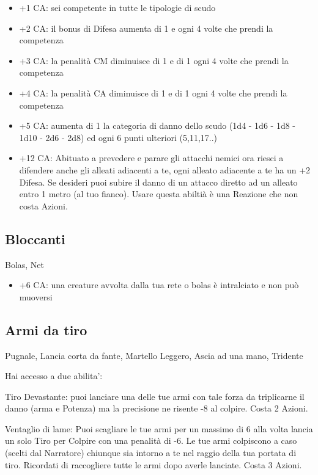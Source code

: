 \documentclass[a4paper,11pt,twoside,openany]{book}
\begin{document}
\begin{itemize}
	\item +1 CA: sei competente in tutte le tipologie di scudo

	\item +2 CA: il bonus di Difesa aumenta di 1 e ogni 4 volte che prendi la competenza

	\item +3 CA: la penalità CM diminuisce di 1 e di 1 ogni 4 volte che prendi la competenza

	\item +4 CA: la penalità CA diminuisce di 1 e di 1 ogni 4 volte che prendi la competenza

	\item +5 CA: aumenta di 1 la categoria di danno dello scudo (1d4 - 1d6 - 1d8 - 1d10 - 2d6 - 2d8) ed ogni 6 punti ulteriori (5,11,17..)

	\item +12 CA: Abituato a prevedere e parare gli attacchi nemici ora riesci a difendere anche gli alleati adiacenti a te, ogni alleato adiacente a te ha un +2 Difesa. Se desideri puoi subire il danno di un attacco diretto ad un alleato entro 1 metro (al tuo fianco). Usare questa abiltià è una Reazione che non costa Azioni.

\end{itemize}

\subsection{Bloccanti} Bolas, Net

\begin{itemize}
	\item +6 CA: una creature avvolta dalla tua rete o bolas è intralciato e non può muoversi

\end{itemize}

\subsection{Armi da tiro} Pugnale, Lancia corta da fante, Martello Leggero, Ascia ad una mano, Tridente

Hai accesso a due abilita':

Tiro Devastante: puoi lanciare una delle tue armi con tale forza da triplicarne il danno (arma e Potenza) ma la precisione ne risente -8 al colpire. Costa 2 Azioni.

Ventaglio di lame: Puoi scagliare le tue armi per un massimo di 6 alla volta lancia un solo Tiro per Colpire con una penalità di -6. Le tue armi colpiscono a caso (scelti dal Narratore) chiunque sia intorno a te nel raggio della tua portata di tiro. Ricordati di raccogliere tutte le armi dopo averle lanciate. Costa 3 Azioni.
\end{document}
